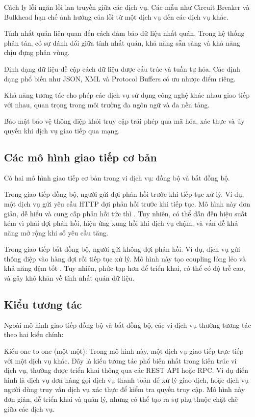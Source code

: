 Cách ly lỗi ngăn lỗi lan truyền giữa các dịch vụ. Các mẫu như Circuit Breaker và Bulkhead hạn chế ảnh hưởng của lỗi từ một dịch vụ đến các dịch vụ khác.

Tính nhất quán liên quan đến cách đảm bảo dữ liệu nhất quán. Trong hệ thống phân tán, có sự đánh đổi giữa tính nhất quán, khả năng sẵn sàng và khả năng chịu đựng phân vùng.

Định dạng dữ liệu đề cập cách dữ liệu được cấu trúc và tuần tự hóa. Các định dạng phổ biến như JSON, XML và Protocol Buffers có ưu nhược điểm riêng.

Khả năng tương tác cho phép các dịch vụ sử dụng công nghệ khác nhau giao tiếp với nhau, quan trọng trong môi trường đa ngôn ngữ và đa nền tảng.

Bảo mật bảo vệ thông điệp khỏi truy cập trái phép qua mã hóa, xác thực và ủy quyền khi dịch vụ giao tiếp qua mạng.

\subsection{Các mô hình giao tiếp cơ bản}
Có hai mô hình giao tiếp cơ bản trong vi dịch vụ: đồng bộ và bất đồng bộ.

Trong giao tiếp đồng bộ, người gửi đợi phản hồi trước khi tiếp tục xử lý. Ví dụ, một dịch vụ gửi yêu cầu HTTP đợi phản hồi trước khi tiếp tục. Mô hình này đơn giản, dễ hiểu và cung cấp phản hồi tức thì \cite{newman2015}. Tuy nhiên, có thể dẫn đến hiệu suất kém vì phải đợi phản hồi, hiệu ứng xung hồi khi dịch vụ chậm, và vấn đề khả năng mở rộng khi số yêu cầu tăng.

Trong giao tiếp bất đồng bộ, người gửi không đợi phản hồi. Ví dụ, dịch vụ gửi thông điệp vào hàng đợi rồi tiếp tục xử lý. Mô hình này tạo coupling lỏng lẻo và khả năng đệm tốt \cite{hohpe2004}. Tuy nhiên, phức tạp hơn để triển khai, có thể có độ trễ cao, và gây khó khăn về tính nhất quán dữ liệu.

\subsection{Kiểu tương tác}
Ngoài mô hình giao tiếp đồng bộ và bất đồng bộ, các vi dịch vụ thường tương tác theo hai kiểu chính:

Kiểu one-to-one (một-một): Trong mô hình này, một dịch vụ giao tiếp trực tiếp với một dịch vụ khác. Đây là kiểu tương tác phổ biến nhất trong kiến trúc vi dịch vụ, thường được triển khai thông qua các REST API hoặc RPC. Ví dụ điển hình là dịch vụ đơn hàng gọi dịch vụ thanh toán để xử lý giao dịch, hoặc dịch vụ người dùng truy vấn dịch vụ xác thực để kiểm tra quyền truy cập. Mô hình này đơn giản, dễ triển khai và quản lý, nhưng có thể tạo ra sự phụ thuộc chặt chẽ giữa các dịch vụ.


